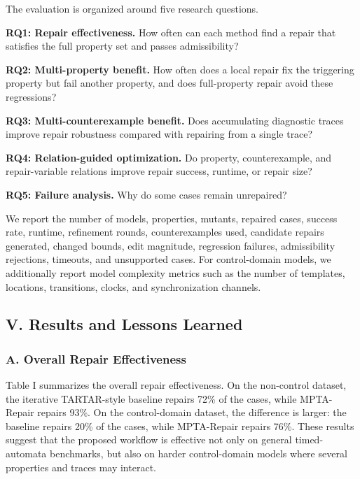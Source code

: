 \documentclass[
]{article}
\begin{document}
The evaluation is organized around five research questions.

\textbf{RQ1: Repair effectiveness.} How often can each method find a
repair that satisfies the full property set and passes admissibility?

\textbf{RQ2: Multi-property benefit.} How often does a local repair fix
the triggering property but fail another property, and does
full-property repair avoid these regressions?

\textbf{RQ3: Multi-counterexample benefit.} Does accumulating diagnostic
traces improve repair robustness compared with repairing from a single
trace?

\textbf{RQ4: Relation-guided optimization.} Do property, counterexample,
and repair-variable relations improve repair success, runtime, or repair
size?

\textbf{RQ5: Failure analysis.} Why do some cases remain unrepaired?

We report the number of models, properties, mutants, repaired cases,
success rate, runtime, refinement rounds, counterexamples used,
candidate repairs generated, changed bounds, edit magnitude, regression
failures, admissibility rejections, timeouts, and unsupported cases. For
control-domain models, we additionally report model complexity metrics
such as the number of templates, locations, transitions, clocks, and
synchronization channels.

\subsection{V. Results and Lessons
Learned}\label{v.-results-and-lessons-learned}

\subsubsection{A. Overall Repair
Effectiveness}\label{a.-overall-repair-effectiveness}

Table I summarizes the overall repair effectiveness. On the non-control
dataset, the iterative TARTAR-style baseline repairs 72\% of the cases,
while MPTA-Repair repairs 93\%. On the control-domain dataset, the
difference is larger: the baseline repairs 20\% of the cases, while
MPTA-Repair repairs 76\%. These results suggest that the proposed
workflow is effective not only on general timed-automata benchmarks, but
also on harder control-domain models where several properties and traces
may interact.
\end{document}
